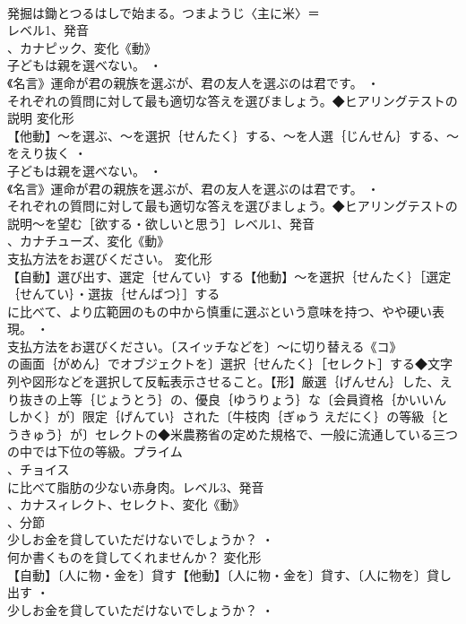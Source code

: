 \documentclass[8pt]{extreport}
\begin{document}
\begin{CJK}{UTF8}{min}
\\	発掘は鋤とつるはしで始まる。つまようじ〈主に米〉＝
\\	レベル1、発音
\\	、カナピック、変化《動》
\\	子どもは親を選べない。 ・
\\	《名言》運命が君の親族を選ぶが、君の友人を選ぶのは君です。 ・
\\	それぞれの質問に対して最も適切な答えを選びましょう。◆ヒアリングテストの説明	変化形 
\\	【他動】～を選ぶ、～を選択｛せんたく｝する、～を人選｛じんせん｝する、～をえり抜く ・
\\	子どもは親を選べない。 ・
\\	《名言》運命が君の親族を選ぶが、君の友人を選ぶのは君です。 ・
\\	それぞれの質問に対して最も適切な答えを選びましょう。◆ヒアリングテストの説明～を望む［欲する・欲しいと思う］レベル1、発音
\\	、カナチューズ、変化《動》
\\	支払方法をお選びください。	変化形 
\\	【自動】選び出す、選定｛せんてい｝する【他動】～を選択｛せんたく｝［選定｛せんてい｝・選抜｛せんばつ｝］する
\\	に比べて、より広範囲のもの中から慎重に選ぶという意味を持つ、やや硬い表現。 ・
\\	支払方法をお選びください。〔スイッチなどを〕～に切り替える《コ》
\\	の画面｛がめん｝でオブジェクトを〕選択｛せんたく｝［セレクト］する◆文字列や図形などを選択して反転表示させること。【形】厳選｛げんせん｝した、えり抜きの上等｛じょうとう｝の、優良｛ゆうりょう｝な〔会員資格｛かいいん しかく｝が〕限定｛げんてい｝された〔牛枝肉｛ぎゅう えだにく｝の等級｛とうきゅう｝が〕セレクトの◆米農務省の定めた規格で、一般に流通している三つの中では下位の等級。プライム
\\	、チョイス
\\	に比べて脂肪の少ない赤身肉。レベル3、発音
\\	、カナスィレクト、セレクト、変化《動》
\\	、分節
\\	少しお金を貸していただけないでしょうか？ ・
\\	何か書くものを貸してくれませんか？	変化形 
\\	【自動】〔人に物・金を〕貸す【他動】〔人に物・金を〕貸す、〔人に物を〕貸し出す ・
\\	少しお金を貸していただけないでしょうか？ ・

\end{CJK}
\end{document}
